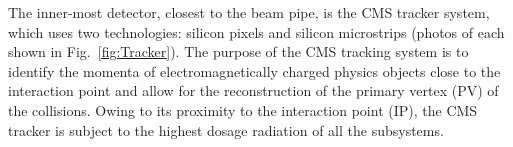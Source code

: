 
The inner-most detector, closest to the beam pipe, is the CMS tracker system, which uses two technologies: silicon pixels and silicon microstrips (photos of each shown in Fig.~\ref{fig:Tracker}). The purpose of the CMS tracking system is to identify the momenta of electromagnetically charged physics objects close to the interaction point and allow for the reconstruction of the primary vertex (PV) of the collisions. Owing to its proximity to the interaction point (IP), the CMS tracker is subject to the highest dosage radiation of all the subsystems.

\begin{figure}[H]
    \centering
\end{figure}
